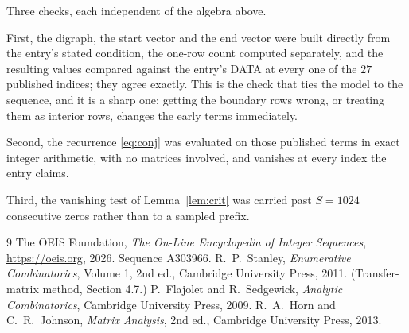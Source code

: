 \documentclass[11pt,a4paper]{article}
\theoremstyle{plain}
\theoremstyle{definition}
\begin{document}
Three checks, each independent of the algebra above.

First, the digraph, the start vector and the end vector were built directly from the
entry's stated condition, the one-row count computed separately, and the resulting values
compared against the entry's DATA at every one of the $27$ published indices; they
agree exactly. This is the check that ties the model to the sequence, and it is a sharp one:
getting the boundary rows wrong, or treating them as interior rows, changes the early terms
immediately.

Second, the recurrence \eqref{eq:conj} was evaluated on those published terms in exact
integer arithmetic, with no matrices involved, and vanishes at every index the entry claims.

Third, the vanishing test of Lemma~\ref{lem:crit} was carried past $S=1024$ consecutive
zeros rather than to a sampled prefix.

\begin{thebibliography}{9}
 The OEIS Foundation, \emph{The On-Line Encyclopedia of Integer
Sequences}, \url{https://oeis.org}, 2026. Sequence A303966.
 R.~P.~Stanley, \emph{Enumerative Combinatorics}, Volume 1, 2nd ed.,
Cambridge University Press, 2011. (Transfer-matrix method, Section 4.7.)
 P.~Flajolet and R.~Sedgewick, \emph{Analytic Combinatorics}, Cambridge
University Press, 2009.
 R.~A.~Horn and C.~R.~Johnson, \emph{Matrix Analysis}, 2nd ed., Cambridge
University Press, 2013.
\end{thebibliography}
\end{document}
